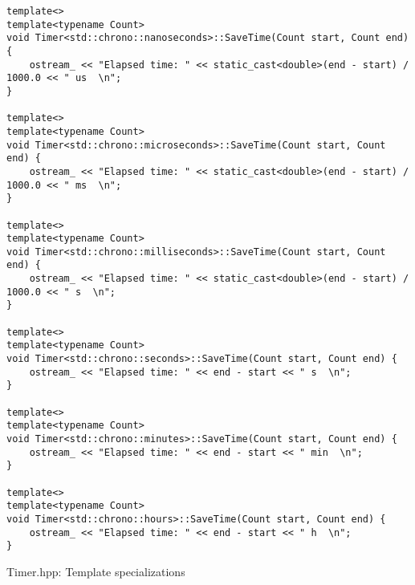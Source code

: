 \begin{listing}[htb]
\begin{verbatim}
template<>
template<typename Count>
void Timer<std::chrono::nanoseconds>::SaveTime(Count start, Count end) {
    ostream_ << "Elapsed time: " << static_cast<double>(end - start) / 1000.0 << " us  \n";
}

template<>
template<typename Count>
void Timer<std::chrono::microseconds>::SaveTime(Count start, Count end) {
    ostream_ << "Elapsed time: " << static_cast<double>(end - start) / 1000.0 << " ms  \n";
}

template<>
template<typename Count>
void Timer<std::chrono::milliseconds>::SaveTime(Count start, Count end) {
    ostream_ << "Elapsed time: " << static_cast<double>(end - start) / 1000.0 << " s  \n";
}

template<>
template<typename Count>
void Timer<std::chrono::seconds>::SaveTime(Count start, Count end) {
    ostream_ << "Elapsed time: " << end - start << " s  \n";
}

template<>
template<typename Count>
void Timer<std::chrono::minutes>::SaveTime(Count start, Count end) {
    ostream_ << "Elapsed time: " << end - start << " min  \n";
}

template<>
template<typename Count>
void Timer<std::chrono::hours>::SaveTime(Count start, Count end) {
    ostream_ << "Elapsed time: " << end - start << " h  \n";
}
\end{verbatim}
\caption{Timer.hpp: Template specializations}
\label{lst:timer_specializations}
\end{listing}

